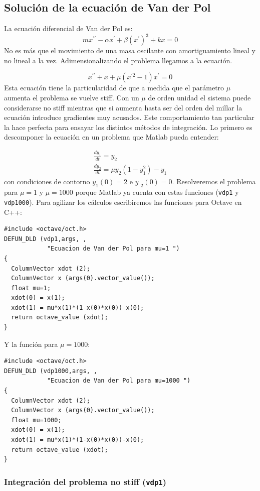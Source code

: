 \subsection{Solución de la ecuación de Van der Pol}

La ecuación diferencial de Van der Pol es:
$$ mx^{\prime\prime}-\alpha
x^{\prime}+\beta\left(x^{\prime}\right)^{3}+kx=0$$
 No es más que el
movimiento de una masa oscilante con amortiguamiento lineal y no
lineal a la vez. Adimensionalizando el problema llegamos a la
ecuación.

$$x^{\prime\prime}+x+\mu(x^{\prime2}-1)x^{\prime}=0$$
 Esta ecuación
tiene la particularidad de que a medida que el parámetro $\mu$ aumenta
el problema se vuelve stiff. Con un $\mu$ de orden unidad el sistema
puede considerarse no stiff mientras que si aumenta hasta ser del
orden del millar la ecuación introduce gradientes muy acusados. Este
comportamiento tan particular la hace perfecta para ensayar los
distintos métodos de integración. Lo primero es descomponer la
ecuación en un problema que Matlab pueda entender:

$$
\begin{array}{l}
  \frac{dy_{1}}{dt}=y_{2}\\
  \frac{dy_{2}}{dt}=\mu y_{2}(1-y_{1}^{2})-y_{1}\end{array}$$
con condiciones de contorno $y_{1}(0)=2$ e $y_{:2}(0)=0$. Resolveremos
el problema para $\mu=1$ y $\mu=1000$ porque Matlab ya cuenta con
estas funciones (\texttt{vdp1} y \texttt{vdp1000}). Para agilizar
los cálculos escribiremos las funciones para Octave en C++:

\begin{verbatim}
#include <octave/oct.h>
DEFUN_DLD (vdp1,args, ,
            "Ecuacion de Van der Pol para mu=1 ")
{
  ColumnVector xdot (2);
  ColumnVector x (args(0).vector_value());
  float mu=1;
  xdot(0) = x(1);
  xdot(1) = mu*x(1)*(1-x(0)*x(0))-x(0);
  return octave_value (xdot);
}
\end{verbatim}
Y la función para $\mu=1000$:

  \begin{verbatim}
#include <octave/oct.h>
DEFUN_DLD (vdp1000,args, ,
            "Ecuacion de Van der Pol para mu=1000 ")
{
  ColumnVector xdot (2);
  ColumnVector x (args(0).vector_value());
  float mu=1000;
  xdot(0) = x(1);  
  xdot(1) = mu*x(1)*(1-x(0)*x(0))-x(0);
  return octave_value (xdot);
}
\end{verbatim}

\subsubsection{Integración del problema no stiff (\texttt{vdp1})}

